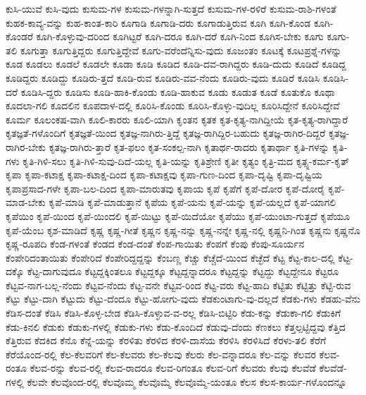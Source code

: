 {ಕುಸಿ-ಯುವೆ
ಕುಸಿ-ವುದು
ಕುಸುಮ-ಗಳ
ಕುಸುಮ-ಗಳನ್ನಾಗಿ-ಸುತ್ತದೆ
ಕುಸುಮ-ಗಳ-ರಳಿರೆ
ಕುಸುಮ-ರಾಶಿ-ಗಳಂತೆ
ಕುಹಕ-ಕಾವ್ಯ-ವನ್ನು
ಕುಹ-ಕಾಂತ-ಕಾರಿ
ಕೂಗಾಡಿ
ಕೂಗಾಡಿ-ದರು
ಕೂಗಾಡುತ್ತಿರುವ
ಕೂಗಿ
ಕೂಗಿ-ಕೊಂಡ
ಕೂಗಿ-ಕೊಂಡರೆ
ಕೂಗಿ-ಕೊಳ್ಳುವು-ದರಿಂದ
ಕೂಗಿಟ್ಟರೆ
ಕೂಗಿ-ದರೂ
ಕೂಗಿ-ದರೆ
ಕೂಗಿ-ನಿಂದ
ಕೂಗಿಸ-ಬೇಕು
ಕೂಗು
ಕೂಗು-ತಲಿ
ಕೂಗುತ್ತಾ
ಕೂಗುತ್ತಿದ್ದರು
ಕೂಗುತ್ತಿದ್ದೇವೆ
ಕೂಗು-ವರೆಂದೆನ್ನಿಸು-ವುದು
ಕೂಜಂತಂ
ಕೂಟಕ್ಕೆ
ಕೂಟಪ್ರಶ್ನೆ-ಗಳನ್ನು
ಕೂಡ
ಕೂಡಲು
ಕೂಡಲೆ
ಕೂಡಲೇ
ಕೂಡಾ
ಕೂಡಿ
ಕೂಡಿದ
ಕೂಡಿ-ದವ-ರಾಗಿದ್ದರು
ಕೂಡಿ-ದುದು
ಕೂಡಿದೆ
ಕೂಡಿದ್ದ
ಕೂಡಿದ್ದರು
ಕೂಡಿದ್ದು
ಕೂಡಿರು-ತ್ತದೆ
ಕೂಡಿ-ರುವ
ಕೂಡಿರು-ವವ-ನೆಂದು
ಕೂಡಿರು-ವುದು
ಕೂಡಿರೆ
ಕೂಡಿಸಿ
ಕೂಡಿಸಿ-ದರೆ
ಕೂಡಿಸಿ-ದ್ದರು
ಕೂಡಿಸು
ಕೂಡಿ-ಹಾಕಿ-ಕೊಂಡು
ಕೂಡಿ-ಹಾಕುವ
ಕೂಡು
ಕೂಡುತ
ಕೂಡೆ
ಕೂತುಕೊ
ಕೂಥಾ
ಕೂದಲಾ-ಗಲಿ
ಕೂದಲಿನ
ಕೂಪದಾಳ-ದಲ್ಲಿ
ಕೂರಿಸಿ-ಕೊಂಡು
ಕೂರಿಸಿ-ಕೊಳ್ಳು-ವುದಿಲ್ಲ
ಕೂರಿಸಿದ್ದೇನೆ
ಕೂರಿಸಿದ್ದೇವೆ
ಕೂರ್ಮ
ಕೂಲಂಕಷ-ವಾಗಿ
ಕೂಲಿ-ಕಾರರು
ಕೂಲಿ-ಯಾಗಿ
ಕೃಂತನ
ಕೃತಕ
ಕೃತ-ಕೃತ್ಯ-ನಾಗಿದ್ದೀಯೆ
ಕೃತ-ಕೃತ್ಯ-ರಾಗಿದ್ದಾರೆ
ಕೃತಜ್ಞತೆ-ಗಳೊಂದಿಗೆ
ಕೃತಜ್ಞತೆ-ಯಿಂದ
ಕೃತಜ್ಞ-ನಾಗಿರು-ತ್ತಿದ್ದೆ
ಕೃತಜ್ಞ-ರಾಗಿದ್ದಿರ-ಬಹುದು
ಕೃತಜ್ಞ-ರಾಗಿರ-ದಿದ್ದರೆ
ಕೃತಜ್ಞ-ರಾಗಿರ-ಬೇಕು
ಕೃತಜ್ಞ-ರಾಗಿರು-ತ್ತಾರೆ
ಕೃತ-ಫಲಂ
ಕೃತ-ಸಂಕಲ್ಪ-ನಾಗಿ
ಕೃತಾರ್ಥ-ರಾದರು
ಕೃತಾರ್ಥಾ
ಕೃತಿ-ಗಳನ್ನು
ಕೃತಿ-ಗಳು
ಕೃತಿ-ಗಿಳಿ-ಸಲು
ಕೃತಿ-ಗಿಳಿ-ಸುವು-ದಿದೆ-ಯಲ್ಲ
ಕೃತಿ-ಯನ್ನು
ಕೃತಿಶ್ರೇಣಿ
ಕೃತೀ
ಕೃತ್ಯಂ
ಕೃತ್ರಿ-ಮದ
ಕೃತ್ಸ್ನ-ಕರ್ಮ-ಕೃತ್
ಕೃಪಾ
ಕೃಪಾ-ಕಟಾಕ್ಷ
ಕೃಪಾ-ಕಟಾಕ್ಷ-ದಿಂದ
ಕೃಪಾ-ಕಟಾಕ್ಷವು
ಕೃಪಾ-ಗುಣ-ದಿಂದ
ಕೃಪಾ-ದೃಷ್ಟಿ
ಕೃಪಾ-ದೃಷ್ಟಿಯ
ಕೃಪಾಪ್ರಸಾದ-ಗಳೇ
ಕೃಪಾ-ಬಲ-ದಿಂದ
ಕೃಪಾ-ಮಾರುತವು
ಕೃಪಾಯ
ಕೃಪೆ
ಕೃಪೆಗೆ
ಕೃಪೆ-ದೋರ
ಕೃಪೆ-ದೋರೈ
ಕೃಪೆ-ಮಾಡ-ಬೇಕು
ಕೃಪೆ-ಮಾಡಿ
ಕೃಪೆ-ಮಾಡುತ್ತಾನೆ
ಕೃಪೆಯ
ಕೃಪೆ-ಯನು
ಕೃಪೆ-ಯನ್ನು
ಕೃಪೆ-ಯಲ್ಲದೆ
ಕೃಪೆ-ಯಾಗಲಿ
ಕೃಪೆಯಿಂ
ಕೃಪೆ-ಯಿಂದ
ಕೃಪೆ-ಯಿಂದಲಿ
ಕೃಪೆ-ಯಿಟ್ಟು
ಕೃಪೆ-ಯಿದೆಯೋ
ಕೃಪೆಯು
ಕೃಪೆ-ಯುಂಟಾ-ಗುತ್ತದೆ
ಕೃಪೆಯೂ
ಕೃಪೆ-ಯೆಂಬ
ಕೃಶ-ಮಾಡಿದೆ
ಕೃಷ್ಣ
ಕೃಷ್ಣ-ಗೀತೆ
ಕೃಷ್ಣನ
ಕೃಷ್ಣ-ನನ್ನು
ಕೃಷ್ಣ-ನನ್ನೇ
ಕೃಷ್ಣ-ನಲ್ಲಿ
ಕೃಷ್ಣನಿ-ಗಿಂತ
ಕೃಷ್ಣನು
ಕೃಷ್ಣನೊ
ಕೃಷ್ಣ-ರೂಪದಿ
ಕೆಂಡ-ಗಳಂತೆ
ಕೆಂಡದ
ಕೆಂಡ-ದಂತೆ
ಕೆಂಪ-ಗಾಯಿತು
ಕೆಂಪಗೆ
ಕೆಂಪು
ಕೆಂಪು-ಸೂರ್ಯನ
ಕೆಂಪೇರಿದಂತಾಯಿತು
ಕೆಂಪೇರಿದೆ
ಕೆಂಪೇರಿದ್ದದ್ದನ್ನು
ಕೆಂಬಣ್ಣ
ಕೆಚ್ಚು
ಕೆಚ್ಚೆದೆ-ಯಿಂದ
ಕೆಚ್ಛೆದೆ
ಕೆಟ್ಟ
ಕೆಟ್ಟ-ಕಾಲ-ದಲ್ಲಿ
ಕೆಟ್ಟ-ದಕ್ಕೊ
ಕೆಟ್ಟ-ದಾಗುವುದೂ
ಕೆಟ್ಟದ್ದಕ್ಕಿಂತಲೂ
ಕೆಟ್ಟದ್ದಕ್ಕೂ
ಕೆಟ್ಟದ್ದನ್ನಾದರೂ
ಕೆಟ್ಟದ್ದನ್ನು
ಕೆಟ್ಟದ್ದು
ಕೆಟ್ಟದ್ದೇನೂ
ಕೆಟ್ಟರೂ
ಕೆಟ್ಟವ-ನಾಗ-ಬಲ್ಲ-ನೆಂದು
ಕೆಟ್ಟವ-ನೆಂದು
ಕೆಟ್ಟ-ವನೇ
ಕೆಟ್ಟವ-ರಿಂದ
ಕೆಟ್ಟ-ವರು
ಕೆಟ್ಟ-ಹಾದಿ
ಕೆಟ್ಟಿತು
ಕೆಟ್ಟಿತ್ತು
ಕೆಟ್ಟಿ-ರುವ
ಕೆಟ್ಟು
ಕೆಟ್ಟು-ದಾಗಿ
ಕೆಟ್ಟುದು
ಕೆಟ್ಟು-ದೆಂದೂ
ಕೆಟ್ಟು-ಹೋಗು-ವುದು
ಕೆಡಕುಂಟಾಗು-ವು-ದಲ್ಲದೆ
ಕೆಡಕು-ಗಳು
ಕೆಡಹು-ವೆನು
ಕೆಡಿಸ-ದಂತೆ
ಕೆಡಿಸಿ
ಕೆಡಿಸಿ-ಕೊಳ್ಳ-ಬೇಡ
ಕೆಡಿಸಿ-ಕೊಳ್ಳುವ-ವ-ರಲ್ಲ
ಕೆಡಿಸಿ-ಬಿಟ್ಟಿರಿ
ಕೆಡು-ಕನ್ನು
ಕೆಡುಕಾ-ಗಲಿ
ಕೆಡುಕಿಗೆ
ಕೆಡು-ಕಿನಲಿ
ಕೆಡುಕು
ಕೆಡುಕು-ಗಳಲ್ಲಿ
ಕೆಡುಕು-ಗಳು
ಕೆಡು-ಕೊಂದಿದೆ
ಕೆಡುವು-ದೆಂದು
ಕೆಣಕಲು
ಕೆತ್ತಲ್ಪಟ್ಟಿದ್ದವು
ಕೆತ್ತಿದ
ಕೆತ್ತಿರುವ
ಕೆದಕಿದ
ಕೆನೊ
ಕೆನ್ನೆ-ಯನ್ನು
ಕೆರಳಿತು
ಕೆರಳಿದ
ಕೆರಳಿ-ದಾಸೆಯ
ಕೆರಳಿಸಿ
ಕೆರಳಿಸಿದೆ
ಕೆರಳು-ತಲಿ
ಕೆರೆಗೆ
ಕೆರೆಯೊಂದ-ರಲ್ಲಿ
ಕೆಲ-ಕೆಲವರಿಗೆ
ಕೆಲ-ಕೆಲವರು
ಕೆಲ-ಕೆಲವು
ಕೆಲರು
ಕೆಲ-ವನ್ನಾದರೂ
ಕೆಲ-ವನ್ನು
ಕೆಲವರ
ಕೆಲವ-ರಂತೂ
ಕೆಲವ-ರನ್ನು
ಕೆಲವ-ರಲ್ಲಿ
ಕೆಲವ-ರಾದರೂ
ಕೆಲವ-ರಿಗಂತೂ
ಕೆಲವ-ರಿಗೆ
ಕೆಲವರು
ಕೆಲವು
ಕೆಲವೆಡೆ
ಕೆಲವೆಡೆ-ಗಳಲ್ಲಿ
ಕೆಲವೇ
ಕೆಲವೊಂದ-ರಲ್ಲಿ
ಕೆಲವೊಮ್ಮ
ಕೆಲವೊಮ್ಮೆ
ಕೆಲವೊಮ್ಮೆ-ಯಂತೂ
ಕೆಲಸ
ಕೆಲಸ-ಕಾರ್ಯ-ಗಳೊಂದನ್ನೂ
}
